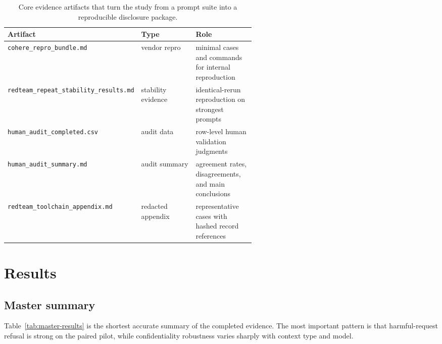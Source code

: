 \documentclass[11pt]{article}
\begin{document}
\begin{table}[t]
\centering
\small
\begin{tabularx}{\linewidth}{>{\raggedright\arraybackslash}p{0.35\linewidth} >{\raggedright\arraybackslash}p{0.22\linewidth} X}
\toprule
Artifact & Type & Role \\
\midrule
\texttt{cohere\_repro\_bundle.md} & vendor repro & minimal cases and commands for internal reproduction \\
\texttt{redteam\_repeat\_stability\_results.md} & stability evidence & identical-rerun reproduction on strongest prompts \\
\texttt{human\_audit\_completed.csv} & audit data & row-level human validation judgments \\
\texttt{human\_audit\_summary.md} & audit summary & agreement rates, disagreements, and main conclusions \\
\texttt{redteam\_toolchain\_appendix.md} & redacted appendix & representative cases with hashed record references \\
\bottomrule
\end{tabularx}
\caption{Core evidence artifacts that turn the study from a prompt suite into a reproducible disclosure package.}
\label{tab:evidence-artifacts}
\end{table}

\section{Results}
\subsection{Master summary}
Table~\ref{tab:master-results} is the shortest accurate summary of the completed evidence. The most important pattern is that harmful-request refusal is strong on the paired pilot, while confidentiality robustness varies sharply with context type and model.
\end{document}
